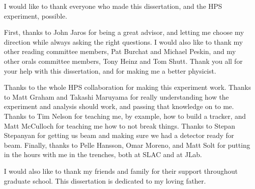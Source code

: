 I would like to thank everyone who made this dissertation, and the HPS experiment, possible.

First, thanks to John Jaros for being a great advisor, and letting me choose my direction while always asking the right questions.
I would also like to thank my other reading committee members, Pat Burchat and Michael Peskin, and my other orals committee members, Tony Heinz and Tom Shutt.
Thank you all for your help with this dissertation, and for making me a better physicist.

Thanks to the whole HPS collaboration for making this experiment work.
Thanks to Matt Graham and Takashi Maruyama for really understanding how the experiment and analysis should work, and passing that knowledge on to me.
Thanks to Tim Nelson for teaching me, by example, how to build a tracker, and Matt McCulloch for teaching me how to not break things.
Thanks to Stepan Stepanyan for getting us beam and making sure we had a detector ready for beam.
Finally, thanks to Pelle Hansson, Omar Moreno, and Matt Solt for putting in the hours with me in the trenches, both at SLAC and at JLab.

I would also like to thank my friends and family for their support throughout graduate school.
This dissertation is dedicated to my loving father.
